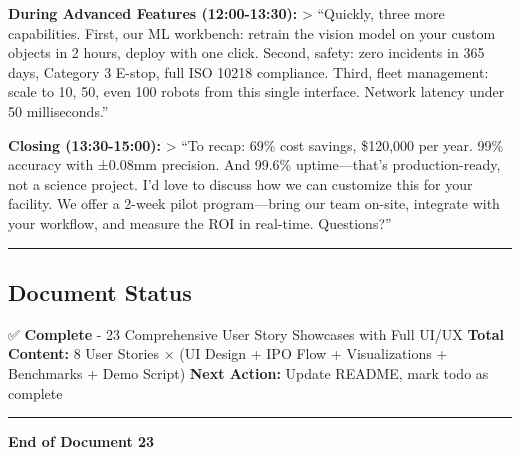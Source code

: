 \documentclass[
]{article}
\begin{document}
\textbf{During Advanced Features (12:00-13:30):} \textgreater{}
``Quickly, three more capabilities. First, our ML workbench: retrain the
vision model on your custom objects in 2 hours, deploy with one click.
Second, safety: zero incidents in 365 days, Category 3 E-stop, full ISO
10218 compliance. Third, fleet management: scale to 10, 50, even 100
robots from this single interface. Network latency under 50
milliseconds.''

\textbf{Closing (13:30-15:00):} \textgreater{} ``To recap: 69\% cost
savings, \$120,000 per year. 99\% accuracy with ±0.08mm precision. And
99.6\% uptime---that's production-ready, not a science project. I'd love
to discuss how we can customize this for your facility. We offer a
2-week pilot program---bring our team on-site, integrate with your
workflow, and measure the ROI in real-time. Questions?''

\begin{center}\rule{0.5\linewidth}{0.5pt}\end{center}

\hypertarget{document-status}{%
\subsection{Document Status}\label{document-status}}

✅ \textbf{Complete} - 23 Comprehensive User Story Showcases with Full
UI/UX \textbf{Total Content:} 8 User Stories × (UI Design + IPO Flow +
Visualizations + Benchmarks + Demo Script) \textbf{Next Action:} Update
README, mark todo as complete

\begin{center}\rule{0.5\linewidth}{0.5pt}\end{center}

\textbf{End of Document 23}
\end{document}
